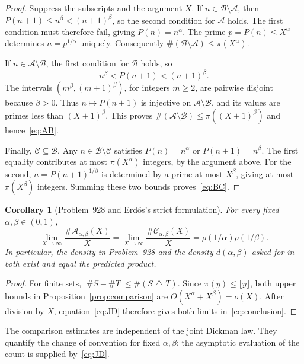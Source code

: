 \documentclass[11pt,a4paper]{amsart}
\newtheorem{corollary}[proposition]{Corollary}
\newcommand{\A}{\mathcal A}
\newcommand{\B}{\mathcal B}
\newcommand{\C}{\mathcal C}
\begin{document}
\begin{proof}
Suppress the subscripts and the argument $X$. If $n\in\B\setminus\A$,
then $P(n+1)\le n^\beta<(n+1)^\beta$, so the second condition for $\A$
holds. The first condition must therefore fail, giving $P(n)=n^\alpha$.
The prime $p=P(n)\le X^\alpha$ determines $n=p^{1/\alpha}$ uniquely.
Consequently $\#(\B\setminus\A)\le\pi(X^\alpha)$.

If $n\in\A\setminus\B$, the first condition for $\B$ holds, so
\[
 n^\beta<P(n+1)<(n+1)^\beta.
\]
The intervals $(m^\beta,(m+1)^\beta)$, for integers $m\ge2$, are
pairwise disjoint because $\beta>0$. Thus $n\mapsto P(n+1)$ is injective
on $\A\setminus\B$, and its values are primes less than $(X+1)^\beta$.
This proves $\#(\A\setminus\B)\le\pi((X+1)^\beta)$ and hence~\eqref{eq:AB}.

Finally, $\C\subseteq\B$. Any $n\in\B\setminus\C$ satisfies
$P(n)=n^\alpha$ or $P(n+1)=n^\beta$. The first equality contributes at
most $\pi(X^\alpha)$ integers, by the argument above. For the second,
$n=P(n+1)^{1/\beta}$ is determined by a prime at most $X^\beta$,
giving at most $\pi(X^\beta)$ integers. Summing these two bounds
proves~\eqref{eq:BC}.
\end{proof}

\begin{corollary}[Problem~928 and Erd\H{o}s's strict formulation]\label{cor:density}
For every fixed $\alpha,\beta\in(0,1)$,
\begin{equation}\label{eq:conclusion}
 \lim_{X\to\infty}\frac{\#\A_{\alpha,\beta}(X)}X
 =\lim_{X\to\infty}\frac{\#\C_{\alpha,\beta}(X)}X
 =\rho(1/\alpha)\rho(1/\beta).
\end{equation}
In particular, the density in Problem~928 and the density
$d(\alpha,\beta)$ asked for in~\cite[p.~25]{Erdos1976Manitoba} both
exist and equal the predicted product.
\end{corollary}

\begin{proof}
For finite sets, $|\#S-\#T|\le\#(S\mathbin\triangle T)$. Since
$\pi(y)\le\lfloor y\rfloor$, both upper bounds in
Proposition~\ref{prop:comparison} are $O(X^\alpha+X^\beta)=o(X)$.
After division by $X$, equation~\eqref{eq:JD} therefore gives both
limits in~\eqref{eq:conclusion}.
\end{proof}

The comparison estimates are independent of the joint Dickman law.
They quantify the change of convention for fixed $\alpha,\beta$;
the asymptotic evaluation of the count is supplied by~\eqref{eq:JD}.
\end{document}
